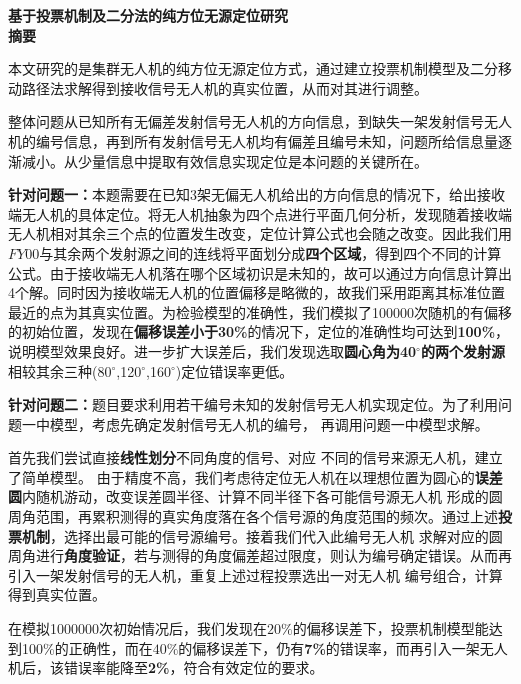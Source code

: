 \documentclass{ctexart}
\begin{document}
\begin{spacing}{2.0}
  \begin{center}
      {\LARGE\textbf{基于投票机制及二分法的纯方位无源定位研究}}\\
      {\Large\textbf{摘要}}\\
  \end{center}
\end{spacing}

本文研究的是集群无人机的纯方位无源定位方式，通过建立投票机制模型及二分移动路径法求解得到接收信号无人机的真实位置，从而对其进行调整。

整体问题从已知所有无偏差发射信号无人机的方向信息，到缺失一架发射信号无人机的编号信息，再到所有发射信号无人机均有偏差且编号未知，问题所给信息量逐渐减小。从少量信息中提取有效信息实现定位是本问题的关键所在。

\textbf{针对问题一：}\quad 本题需要在已知3架无偏无人机给出的方向信息的情况下，给出接收端无人机的具体定位。将无人机抽象为四个点进行平面几何分析，发现随着接收端无人机相对其余三个点的位置发生改变，定位计算公式也会随之改变。因此我们用$FY00$与其余两个发射源之间的连线将平面划分成\textbf{四个区域}，得到四个不同的计算公式。由于接收端无人机落在哪个区域初识是未知的，故可以通过方向信息计算出4个解。同时因为接收端无人机的位置偏移是略微的，故我们采用距离其标准位置最近的点为其真实位置。为检验模型的准确性，我们模拟了100000次随机的有偏移的初始位置，发现在\textbf{偏移误差小于30\%}的情况下，定位的准确性均可达到\textbf{100\%}，说明模型效果良好。进一步扩大误差后，我们发现选取\textbf{圆心角为40$^{\circ}$的两个发射源}相较其余三种(80$^{\circ}$,120$^{\circ}$,160$^{\circ}$)定位错误率更低。

\textbf{针对问题二：}\quad 题目要求利用若干编号未知的发射信号无人机实现定位。为了利用问题一中模型，考虑先确定发射信号无人机的编号，
再调用问题一中模型求解。

首先我们尝试直接\textbf{线性划分}不同角度的信号、对应
不同的信号来源无人机，建立了简单模型。
由于精度不高，我们考虑待定位无人机在以理想位置为圆心的\textbf{误差圆}内随机游动，改变误差圆半径、计算不同半径下各可能信号源无人机
形成的圆周角范围，再累积测得的真实角度落在各个信号源的角度范围的频次。通过上述\textbf{投票机制}，选择出最可能的信号源编号。接着我们代入此编号无人机
求解对应的圆周角进行\textbf{角度验证}，若与测得的角度偏差超过限度，则认为编号确定错误。从而再引入一架发射信号的无人机，重复上述过程投票选出一对无人机
编号组合，计算得到真实位置。

在模拟1000000次初始情况后，我们发现在\textbf{$20\%$}的偏移误差下，投票机制模型能达到100\%的正确性，而在\textbf{$40\%$}的偏移误差下，仍有\textbf{7\%}的错误率，而再引入一架无人机后，该错误率能降至\textbf{2\%}，符合有效定位的要求。
\end{document}
